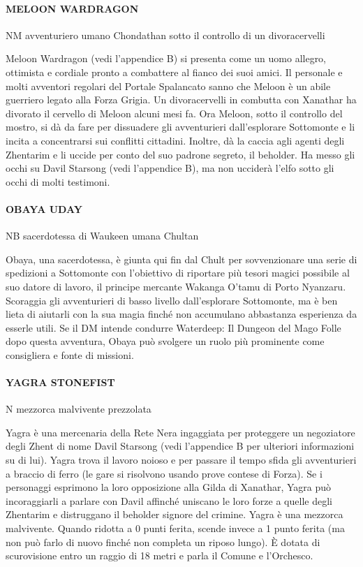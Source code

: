 \documentclass{article}
\begin{document}
                \paragraph{MELOON WARDRAGON}
NM avventuriero umano Chondathan sotto il controllo di un divoracervelli

Meloon Wardragon (vedi l'appendice B) si presenta come un uomo allegro, ottimista e cordiale pronto a combattere al fianco dei suoi amici. Il personale e molti avventori regolari del Portale Spalancato sanno che Meloon è un abile guerriero legato alla Forza Grigia. Un divoracervelli in combutta con Xanathar ha divorato il cervello di Meloon alcuni mesi fa. Ora Meloon, sotto il controllo del mostro, si dà da fare per dissuadere gli avventurieri dall'esplorare Sottomonte e li incita a concentrarsi sui conflitti cittadini. Inoltre, dà la caccia agli agenti degli Zhentarim e li uccide per conto del suo padrone segreto, il beholder. Ha messo gli occhi su Davil Starsong (vedi l'appendice B), ma non ucciderà l’elfo sotto gli occhi di molti testimoni.

                \paragraph{OBAYA UDAY}
NB sacerdotessa di Waukeen umana Chultan

Obaya, una sacerdotessa, è giunta qui fin dal Chult per sovvenzionare una serie di spedizioni a Sottomonte con l’obiettivo di riportare più tesori magici possibile al suo datore di lavoro, il principe mercante Wakanga O’tamu di Porto Nyanzaru. Scoraggia gli avventurieri di basso livello dall’esplorare Sottomonte, ma è ben lieta di aiutarli con la sua magia finché non accumulano abbastanza esperienza da esserle utili. Se il DM intende condurre Waterdeep: Il Dungeon del Mago Folle dopo questa avventura, Obaya può svolgere un ruolo più prominente come consigliera e fonte di missioni.

                \paragraph{YAGRA STONEFIST}
N mezzorca malvivente prezzolata

Yagra è una mercenaria della Rete Nera ingaggiata per proteggere un negoziatore degli Zhent di nome Davil Starsong (vedi l'appendice B per ulteriori informazioni su di lui). Yagra trova il lavoro noioso e per passare il tempo sfida gli avventurieri a braccio di ferro (le gare si risolvono usando prove contese di Forza). Se i personaggi esprimono la loro opposizione alla Gilda di Xanathar, Yagra può incoraggiarli a parlare con Davil affinché uniscano le loro forze a quelle degli Zhentarim e distruggano il beholder signore del crimine. Yagra è una mezzorca malvivente. Quando ridotta a 0 punti ferita, scende invece a 1 punto ferita (ma non può farlo di nuovo finché non completa un riposo lungo). È dotata di scurovisione entro un raggio di 18 metri e parla il Comune e l'Orchesco.
\end{document}
